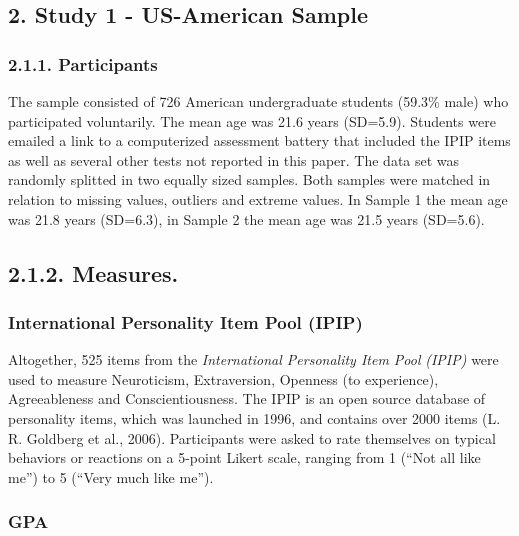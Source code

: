 \documentclass[,man,floatsintext]{apa6}
\theoremstyle{definition}
\theoremstyle{definition}
\theoremstyle{definition}
\theoremstyle{remark}
\begin{document}
\hypertarget{study-1---us-american-sample}{%
\subsection{2. Study 1 - US-American
Sample}\label{study-1---us-american-sample}}

\hypertarget{participants}{%
\subsubsection{2.1.1. Participants}\label{participants}}

The sample consisted of 726 American undergraduate students (59.3\%
male) who participated voluntarily. The mean age was 21.6 years
(SD=5.9). Students were emailed a link to a computerized assessment
battery that included the IPIP items as well as several other tests not
reported in this paper. The data set was randomly splitted in two
equally sized samples. Both samples were matched in relation to missing
values, outliers and extreme values. In Sample 1 the mean age was 21.8
years (SD=6.3), in Sample 2 the mean age was 21.5 years (SD=5.6).

\hypertarget{measures.}{%
\subsection{2.1.2. Measures.}\label{measures.}}

\hypertarget{international-personality-item-pool-ipip}{%
\subsubsection{International Personality Item Pool
(IPIP)}\label{international-personality-item-pool-ipip}}

Altogether, 525 items from the \emph{International Personality Item
Pool} \emph{(IPIP)} were used to measure Neuroticism, Extraversion,
Openness (to experience), Agreeableness and Conscientiousness. The IPIP
is an open source database of personality items, which was launched in
1996, and contains over 2000 items (L. R. Goldberg et al., 2006).
Participants were asked to rate themselves on typical behaviors or
reactions on a 5-point Likert scale, ranging from 1 (\enquote{Not all
like me}) to 5 (\enquote{Very much like me}).

\hypertarget{gpa}{%
\subsubsection{GPA}\label{gpa}}
\end{document}
